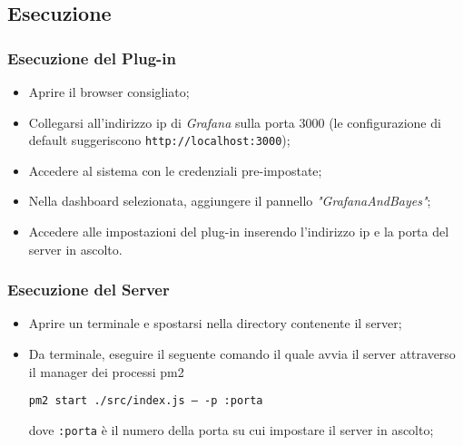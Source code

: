 	
\subsection{Esecuzione}\label{run}
\subsubsection{Esecuzione del Plug-in}
\begin{itemize}
	\item Aprire il browser consigliato; 
	\item Collegarsi all'indirizzo ip di \textit{Grafana} sulla porta 3000 (le configurazione di default suggeriscono \texttt{http://localhost:3000}); 
	\item Accedere al sistema con le credenziali pre-impostate; 
	\item Nella dashboard selezionata, aggiungere il pannello \textit{"GrafanaAndBayes"}; 
	\item Accedere alle impostazioni del plug-in inserendo l'indirizzo ip e la porta del server in ascolto. 
\end{itemize}


\subsubsection{Esecuzione del Server}
\begin{itemize}
	\item Aprire un terminale e spostarsi nella directory contenente il server; 
	\item Da terminale, eseguire il seguente comando il quale avvia il server attraverso il manager dei processi pm2
	\begin{center}
		\texttt{pm2 start ./src/index.js --- -p :porta}
	\end{center}
	dove \texttt{:porta} è il numero della porta su cui impostare il server in ascolto; 
\end{itemize}
	